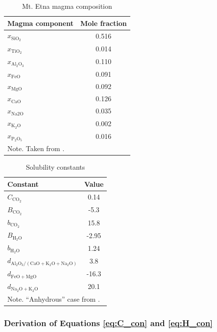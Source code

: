 \begin{table}[]
  \caption{Mt. Etna magma composition}
  \label{tab:magmacomp}
  \centering
  \begin{tabular}{l c}
  \hline \hline
  Magma component & Mole fraction \\
  \hline
  $x_\mathrm{SiO_2}$     & 0.516   \\
  $x_\mathrm{TiO_2}$     & 0.014   \\
  $x_\mathrm{Al_2O_3}$     & 0.110   \\
  $x_\mathrm{FeO}$     & 0.091   \\
  $x_\mathrm{MgO}$     & 0.092   \\
  $x_\mathrm{CaO}$     & 0.126   \\
  $x_\mathrm{Na2O}$     & 0.035   \\
  $x_\mathrm{K_2O}$     & 0.002   \\
  $x_\mathrm{P_2O_5}$     & 0.016   \\
  \hline
  \multicolumn{2}{l}{Note. Taken from \citet{Iacono-Marziano_2012}.} 
  \end{tabular}
\end{table}

\begin{table}
  \caption{Solubility constants}
  \label{tab:soluconst}
  \centering
  \begin{tabular}{l c}
  \hline \hline
  Constant & Value \\
  \hline
  $C_\mathrm{CO_2}$     & 0.14   \\
  $B_\mathrm{CO_2}$     & -5.3   \\
  $b_\mathrm{CO_2}$     & 15.8   \\
  $B_\mathrm{H_2O}$     & -2.95   \\
  $b_\mathrm{H_2O}$     & 1.24   \\
  $d_\mathrm{Al_2O_3/(CaO+K_2O+Na_2O)}$     & 3.8   \\
  $d_\mathrm{FeO+MgO}$     & -16.3   \\
  $d_\mathrm{Na_2O+K_2O}$     & 20.1   \\
  \hline
  \multicolumn{2}{l}{Note. ``Anhydrous'' case from \citet{Iacono-Marziano_2012}.} 
  \end{tabular}
\end{table}

\subsubsection{Derivation of Equations \eqref{eq:C_con} and \eqref{eq:H_con}} \label{sec:Derivation_con}

